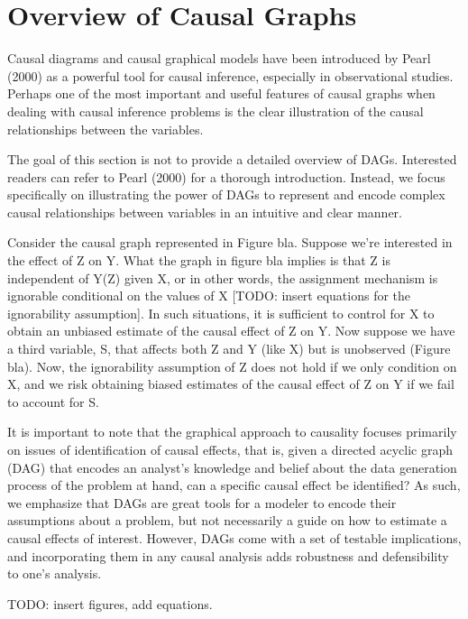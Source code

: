 \section{Overview of Causal Graphs}

Causal diagrams and causal graphical models have been introduced by Pearl 
(2000) as a powerful tool for causal inference, especially in observational 
studies. Perhaps one of the most important and useful features of causal 
graphs when dealing with causal inference problems is the clear illustration 
of the causal relationships between the variables. 

The goal of this section is not to provide a detailed overview of DAGs. Interested readers can refer to Pearl (2000) for a thorough introduction. 
Instead, we focus specifically on illustrating the power of DAGs to represent 
and encode complex  causal relationships between variables in an intuitive and 
clear manner. 

Consider the causal graph represented in Figure bla. Suppose we're interested 
in the effect of Z on Y. What the graph in figure bla implies is that Z is 
independent of Y(Z) given X, or in other words, the assignment mechanism is 
ignorable conditional on the values of X [TODO: insert equations for the 
ignorability assumption]. In such situations, it is sufficient to control for 
X to obtain an unbiased estimate of the causal effect of Z on Y. Now suppose 
we have a third variable, S, that affects both Z and Y (like X) but is 
unobserved (Figure bla). Now, the ignorability assumption of Z does not hold 
if we only condition on X, and we risk obtaining biased estimates of the 
causal effect of Z on Y if we fail to account for S. 


It is important to note that the graphical approach to causality focuses 
primarily on issues of identification of causal effects, that is, given a 
directed acyclic graph (DAG) that encodes an analyst's knowledge and belief 
about the data generation process of the problem at hand, can a specific 
causal effect be identified? As such, we emphasize that DAGs are great tools 
for a modeler to encode their assumptions about a problem, but not necessarily 
a guide on how to estimate a causal effects of interest. However, DAGs come 
with a set of testable implications, and incorporating them in any causal 
analysis adds robustness and defensibility to one's analysis. 

TODO: insert figures, add equations. 




\blindtext[2]